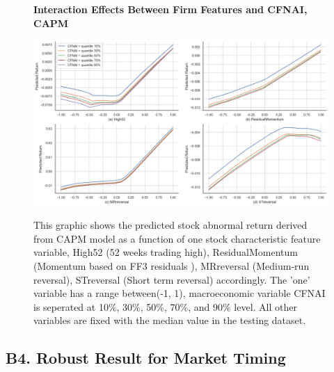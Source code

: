 \begin{figure}[H]
  \centering
  \caption{\textbf{Interaction Effects Between Firm Features and CFNAI, CAPM}}
  \includegraphics[width=.8\textwidth]{images/interactive_effect_capm.png}
  \label{fig: interaction effect_capm}
  \caption*{\footnotesize{This graphic shows the predicted stock abnormal return derived from CAPM model as a function of one stock characteristic feature variable, High52 (52 weeks trading high), ResidualMomentum (Momentum based on FF3 residuals  ), MRreversal (Medium‐run reversal), STreversal (Short term reversal) accordingly. The 'one' variable has a range between(-1, 1), macroeconomic variable CFNAI is seperated at 10\%, 30\%, 50\%, 70\%, and 90\% level. All other variables are fixed with the median value in the testing dataset.}}
\end{figure}

\subsection*{B4. Robust Result for Market Timing}
\label{sec:appendixb5}

